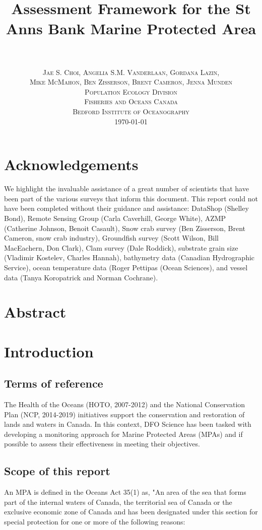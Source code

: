 \documentclass[letterpaper,portrait,11pt]{scrartcl}
\title{
		\usefont{OT1}{bch}{b}{n}
		\horrule{0.5pt} \\[0.4cm]
		\huge Assessment Framework for the St Anns Bank Marine Protected Area  \\
		\horrule{2pt} \\[1.0cm]
}
\author{
		\normalfont \normalsize  \textsc{Jae S. Choi, Angelia S.M. Vanderlaan, Gordana Lazin,} \\
    \normalfont \normalsize  \textsc{Mike McMahon,  Ben Zisserson, Brent Cameron, Jenna Munden} \\ [25pt]		
		\normalfont \normalsize \textsc{Population Ecology Division} \\ 
    \normalfont \normalsize \textsc{Fisheries and Oceans Canada} \\ 
    \normalfont \normalsize \textsc{Bedford Institute of Oceanography} \\ [25pt]
    \normalsize \textsc{\today}
}
\date{}
\numberwithin{equation}{section}		%
\numberwithin{figure}{section}		%
\numberwithin{table}{section}				%
\begin{document}
\maketitle

\setlength{\parskip}{12 pt} %
\setlength{\parindent}{0cm}
\setlength{\floatsep}{2cm}
\setcounter{tocdepth}{2} %
\setcounter{secnumdepth}{3} %
\tableofcontents 

\section*{Acknowledgements}

We highlight the invaluable assistance of a great number of scientists that have been part of the various surveys that inform this document. This report could not have been completed without their guidance and assistance: DataShop (Shelley Bond), Remote Sensing Group (Carla Caverhill, George White), AZMP (Catherine Johnson, Benoit Casault), Snow crab survey (Ben Zisserson, Brent Cameron, snow crab industry), Groundfish survey (Scott Wilson, Bill MacEachern, Don Clark), Clam survey (Dale Roddick), substrate grain size (Vladimir Kostelev, Charles Hannah), bathymetry data (Canadian Hydrographic Service), ocean temperature data (Roger Pettipas (Ocean Sciences), and vessel data (Tanya Koropatrick and Norman Cochrane).

\section*{Abstract}
\clearpage

\section{Introduction}

\subsection{Terms of reference}
The Health of the Oceans (HOTO, 2007-2012) and the National Conservation Plan (NCP, 2014-2019) initiatives support the conservation and restoration of lands and waters in Canada. In this context, DFO Science has been tasked with developing a monitoring approach for Marine Protected Areas (MPAs) and if possible to assess their effectiveness in meeting their objectives. 

\subsection{Scope of this report}
An MPA is defined in the Oceans Act 35(1) as, "An area of the sea that forms part of the internal waters of Canada, the territorial sea of Canada or the exclusive economic zone of Canada and has been designated under this section for special protection for one or more of the following reasons: 
\end{document}
